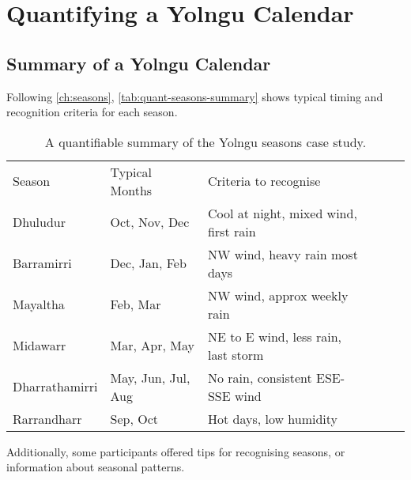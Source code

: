 \section{Quantifying a Yolngu Calendar}

\subsection{Summary of a Yolngu Calendar}
Following \autoref{ch:seasons}, \autoref{tab:quant-seasons-summary} shows
typical timing and recognition criteria for each season.


\begin{table}[h]
    \centering
    \begin{tabular}{llllll}
        Season          &  Typical Months       &  Criteria to recognise                    \\
        Dhuludur        &  Oct, Nov, Dec        &  Cool at night, mixed wind, first rain    \\
        Barramirri      &  Dec, Jan, Feb        &  NW wind, heavy rain most days            \\
        Mayaltha        &  Feb, Mar             &  NW wind, approx weekly rain              \\
        Midawarr        &  Mar, Apr, May        &  NE to E wind, less rain, last storm      \\
        Dharrathamirri  &  May, Jun, Jul, Aug   &  No rain, consistent ESE-SSE wind         \\
        Rarrandharr     &  Sep, Oct             &  Hot days, low humidity                   
    \end{tabular}
    \caption{A quantifiable summary of the Yolngu seasons case study.}
    \label{tab:quant-seasons-summary}
\end{table}


Additionally, some participants offered tips for recognising seasons,
or information about seasonal patterns.

